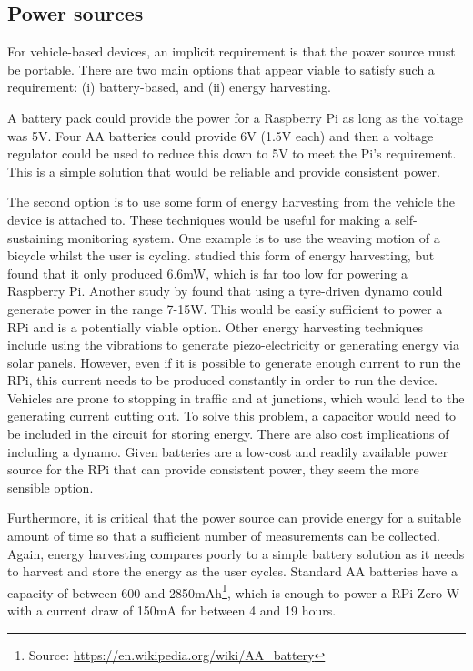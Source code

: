 \documentclass[11pt]{report}
\begin{document}
\subsection{Power sources}

For vehicle-based devices, an implicit requirement is that the power source must be portable. There are two main options that appear viable to satisfy such a requirement: (i) battery-based, and (ii) energy harvesting.

A battery pack could provide the power for a Raspberry Pi as long as the voltage was 5V. Four AA batteries could provide 6V (1.5V each) and then a voltage regulator could be used to reduce this down to 5V to meet the Pi's requirement. This is a simple solution that would be reliable and provide consistent power.

The second option is to use some form of energy harvesting from the vehicle the device is attached to. These techniques would be useful for making a self-sustaining monitoring system. One example is to use the weaving motion of a bicycle whilst the user is cycling. \cite{Yang2012weaving} studied this form of energy harvesting, but found that it only produced 6.6mW, which is far too low for powering a Raspberry Pi. Another study by \cite{hui2011energyharvestingbicycle} found that using a tyre-driven dynamo could generate power in the range 7-15W. This would be easily sufficient to power a RPi and is a potentially viable option. Other energy harvesting techniques include using the vibrations to generate piezo-electricity or generating energy via solar panels. However, even if it is possible to generate enough current to run the RPi, this current needs to be produced constantly in order to run the device. Vehicles are prone to stopping in traffic and at junctions, which would lead to the generating current cutting out. To solve this problem, a capacitor would need to be included in the circuit for storing energy. There are also cost implications of including a dynamo. Given batteries are a low-cost and readily available power source for the RPi that can provide consistent power, they seem the more sensible option.


Furthermore, it is critical that the power source can provide energy for a suitable amount of time so that a sufficient number of measurements can be collected. Again, energy harvesting compares poorly to a simple battery solution as it needs to harvest and store the energy as the user cycles. Standard AA batteries have a capacity of between 600 and 2850mAh\footnote{Source: \href{https://en.wikipedia.org/wiki/AA_battery}{\url{https://en.wikipedia.org/wiki/AA_battery}}}, which is enough to power a RPi Zero W with a current draw of 150mA for between 4 and 19 hours.
\end{document}
